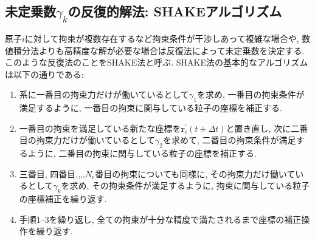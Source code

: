 \subsection{未定乗数$\gamma_{k}$の反復的解法: SHAKEアルゴリズム\cite{1977Ryckaert}}
原子$i$に対して拘束が複数存在するなど拘束条件が干渉しあって複雑な場合や, 数値積分法よりも高精度な解が必要な場合は反復法によって未定乗数を決定する. このような反復法のことをSHAKE法と呼ぶ. 
SHAKE法の基本的なアルゴリズムは以下の通りである:
\begin{enumerate}
    \item 系に一番目の拘束力だけが働いているとして$\gamma_{1}$を求め, 一番目の拘束条件が満足するように, 一番目の拘束に関与している粒子の座標を補正する. 
    \item 一番目の拘束を満足している新たな座標を$\bm{r}_{i}^{\prime}(t + \Delta t)$と置き直し, 次に二番目の拘束力だけが働いているとして$\gamma_{2}$を求めて, 二番目の拘束条件が満足するように, 二番目の拘束に関与している粒子の座標を補正する. 
    \item 三番目, 四番目,,,,$N_{\mathrm{c}}$番目の拘束についても同様に, その拘束力だけ働いているとして$\gamma_{k}$を求め, その拘束条件が満足するように, 拘束に関与している粒子の座標補正を繰り返す. 
    \item 手順1--3を繰り返し, 全ての拘束が十分な精度で満たされるまで座標の補正操作を繰り返す. 
\end{enumerate}

